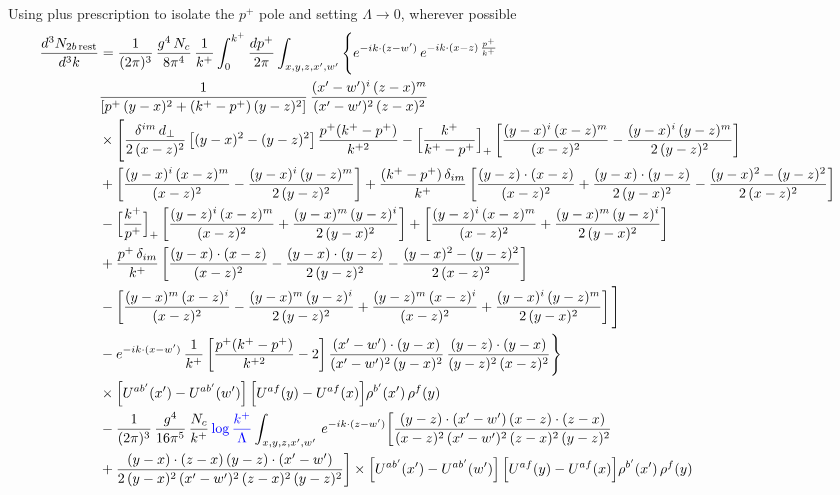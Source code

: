 \documentclass[9pt]{article}
\numberwithin{equation}{section}
\begin{document}
Using plus prescription to isolate the $p^{+}$ pole and setting $\Lambda\to 0$, wherever possible
\begin{align}
\frac{d^{3}N_{2b\,\rm rest}}{d^{3}k} & =\frac{1}{(2\pi)^{3}}\,\frac{g^{4}\,N_{c}}{8\pi^{4}}\,\frac{1}{k^{+}}\int_{0}^{k^{+}}\frac{dp^{+}}{2\pi}\int_{x,y,z,x',w'}\Bigg\{e^{-ik\cdot(z-w')}\,e^{-ik\cdot(x-z)\,\frac{p^{+}}{k^{+}}}\,\notag \\ & \frac{1}{\left[p^{+}\,(y-x)^{2}+(k^{+}-p^{+})\,(y-z)^{2}\right]}\,\frac{(x'-w')^{i}\,(z-x)^{m}}{(x'-w')^{2}\,(z-x)^{2}}\notag\\
&\times\Bigg[\frac{\delta^{im}\,d_{\perp}}{2\,(x-z)^{2}}\left[(y-x)^{2}-(y-z)^{2}\right]\frac{p^{+}(k^{+}-p^{+})}{k^{+2}}
-\Big[\frac{k^{+}}{k^{+}-p^{+}}\Big]_{+}\left[\frac{(y-x)^{i}\,(x-z)^{m}}{(x-z)^{2}}-\frac{(y-x)^{i}\,(y-z)^{m}}{2\,(y-z)^{2}}\right]\notag\\
&+\left[\frac{(y-x)^{i}\,(x-z)^{m}}{(x-z)^{2}}-\frac{(y-x)^{i}\,(y-z)^{m}}{2\,(y-z)^{2}}\right]
+\frac{(k^{+}-p^{+})\,\delta_{im}}{k^{+}}\left[\frac{(y-z)\cdot(x-z)}{(x-z)^{2}}+\frac{(y-x)\cdot(y-z)}{2\,(y-x)^{2}}-\frac{(y-x)^{2}-(y-z)^{2}}{2\,(x-z)^{2}}\right]\notag\\
&-\Big[\frac{k^{+}}{p^{+}}\Big]_{+}\left[\frac{(y-z)^{i}\,(x-z)^{m}}{(x-z)^{2}}+\frac{(y-x)^{m}\,(y-z)^{i}}{2\,(y-x)^{2}}\right]+\left[\frac{(y-z)^{i}\,(x-z)^{m}}{(x-z)^{2}}+\frac{(y-x)^{m}\,(y-z)^{i}}{2\,(y-x)^{2}}\right]\notag\\
&+\frac{p^{+}\,\delta_{im}}{k^{+}}\left[\frac{(y-x)\cdot(x-z)}{(x-z)^{2}}-\frac{(y-x)\cdot(y-z)}{2\,(y-z)^{2}}-\frac{(y-x)^{2}-(y-z)^{2}}{2\,(x-z)^{2}}\right]\notag\\
&-\left[\frac{(y-x)^{m}\,(x-z)^{i}}{(x-z)^{2}}-\frac{(y-x)^{m}\,(y-z)^{i}}{2\,(y-z)^{2}}+\frac{(y-z)^{m}\,(x-z)^{i}}{(x-z)^{2}}+\frac{(y-x)^{i}\,(y-z)^{m}}{2\,(y-x)^{2}}\right]\Bigg]\notag\\
&-e^{-ik\cdot(x-w')}\,\frac{1}{k^{+}}\left[\frac{p^{+}(k^{+}-p^{+})}{k^{+2}}-2\right]\frac{(x'-w')\cdot(y-x)}{(x'-w')^{2}\,(y-x)^{2}}\,\frac{(y-z)\cdot(y-x)}{(y-z)^{2}\,(x-z)^{2}}\Bigg\}\notag\\
&\times\Big[U^{ab'}(x')-U^{ab'}(w')\Big]\,\Big[U^{af}(y)-U^{af}(x)\Big]\rho^{b'}(x')\,\rho^{f}(y)\notag \\ & -\frac{1}{(2\pi)^{3}}\,\frac{g^{4}}{16\pi^{5}}\,\frac{N_{c}}{k^{+}}\,{\color{blue}\log\frac{k^{+}}{\Lambda}}\int_{x,y,z,x',w'}\,e^{-ik\cdot(z-w')} \bigg[\frac{(y-z)\cdot (x'-w')\,(x-z)\cdot (z-x)}{(x-z)^{2}\,(x'-w')^{2}\,(z-x)^{2}\,(y-z)^{2}}\notag \\ & +\frac{(y-x)\cdot (z-x)\,(y-z)\cdot (x'-w')}{2\,(y-x)^{2}\,(x'-w')^{2}\,(z-x)^{2}\,(y-z)^{2}}\bigg]\times\Big[U^{ab'}(x')-U^{ab'}(w')\Big]\,\Big[U^{af}(y)-U^{af}(x)\Big]\rho^{b'}(x')\,\rho^{f}(y)\notag\\

\end{align}
\end{document}
